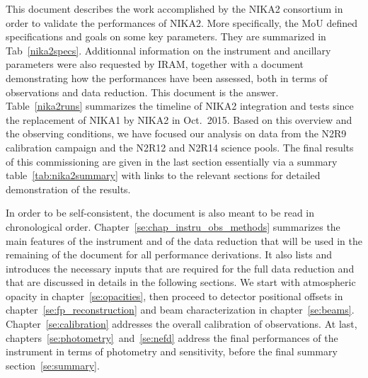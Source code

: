 This document describes the work accomplished by the NIKA2 consortium in order
to validate the performances of NIKA2. More specifically, the MoU defined
specifications and goals on some key parameters. They are summarized in
Tab~\ref{nika2specs}. Additionnal information on the instrument and ancillary
parameters were also requested by IRAM, together with a document demonstrating
how the performances have been assessed, both in terms of observations and data
reduction. This document is the answer.\\

Table~\ref{nika2runs} summarizes the timeline of NIKA2 integration and tests
since the replacement of NIKA1 by NIKA2 in Oct.~2015. Based on this overview and
the observing conditions, we have focused our analysis on data from
the N2R9 calibration campaign and the N2R12 and N2R14 science pools.
The final results of this commissioning are given in the last section
essentially via a summary table~\ref{tab:nika2summary} with links to the
relevant sections for detailed demonstration of the results.

In order to be self-consistent, the document is also meant to be read in chronological
order. Chapter~\ref{se:chap_instru_obs_methods} summarizes the main features of
the instrument and of the data reduction that will be used in the remaining of
the document for all performance derivations. It also lists and introduces the necessary inputs
that are required for the full data reduction and that are discussed in details
in the following sections.
We start with atmospheric opacity in
chapter~\ref{se:opacities}, then proceed to detector positional offsets in
chapter~\ref{se:fp_reconstruction} and beam characterization in chapter~\ref{se:beams}.
Chapter~\ref{se:calibration} addresses the overall calibration of
observations. At last, chapters~\ref{se:photometry}~and~\ref{se:nefd} address
the final performances of the instrument in terms of photometry and sensitivity,
before the final summary section~\ref{se:summary}.

